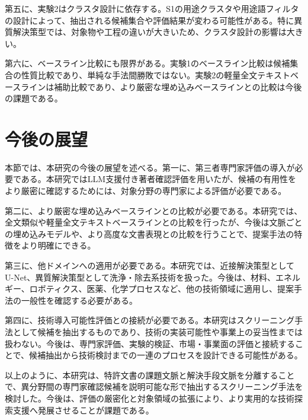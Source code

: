 第五に、実験2はクラスタ設計に依存する。S1の用途クラスタや用途語フィルタの設計によって、抽出される候補集合や評価結果が変わる可能性がある。特に異質解決策型では、対象物や工程の違いが大きいため、クラスタ設計の影響は大きい。

第六に、ベースライン比較にも限界がある。実験1のベースライン比較は候補集合の性質比較であり、単純な手法間勝敗ではない。実験2の軽量全文テキストベースラインは補助比較であり、より厳密な埋め込みベースラインとの比較は今後の課題である。

\section{今後の展望}

本節では、本研究の今後の展望を述べる。第一に、第三者専門家評価の導入が必要である。本研究ではLLM支援付き著者確認評価を用いたが、候補の有用性をより厳密に確認するためには、対象分野の専門家による評価が必要である。

第二に、より厳密な埋め込みベースラインとの比較が必要である。本研究では、全文類似や軽量全文テキストベースラインとの比較を行ったが、今後は文脈ごとの埋め込みモデルや、より高度な文書表現との比較を行うことで、提案手法の特徴をより明確にできる。

第三に、他ドメインへの適用が必要である。本研究では、近接解決策型としてU-Net、異質解決策型として洗浄・除去系技術を扱った。今後は、材料、エネルギー、ロボティクス、医薬、化学プロセスなど、他の技術領域に適用し、提案手法の一般性を確認する必要がある。

第四に、技術導入可能性評価との接続が必要である。本研究はスクリーニング手法として候補を抽出するものであり、技術の実装可能性や事業上の妥当性までは扱わない。今後は、専門家評価、実験的検証、市場・事業面の評価と接続することで、候補抽出から技術検討までの一連のプロセスを設計できる可能性がある。

以上のように、本研究は、特許文書の課題文脈と解決手段文脈を分離することで、異分野間の専門家確認候補を説明可能な形で抽出するスクリーニング手法を検討した。今後は、評価の厳密化と対象領域の拡張により、より実用的な技術探索支援へ発展させることが課題である。
